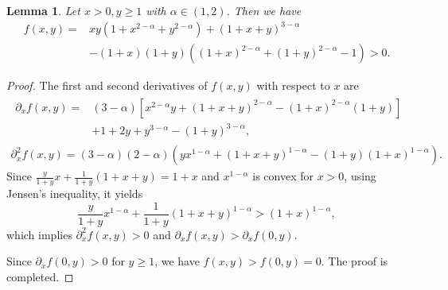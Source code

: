 \documentclass{amsart}
\newtheorem{lemma}[theorem]{Lemma}
\theoremstyle{definition}
\theoremstyle{remark}
\numberwithin{equation}{section}
\begin{document}
\begin{lemma} \label{eq:ineq_fxy}
    Let $x > 0, y\ge 1$ with $\alpha \in (1,2)$. Then we have
    \begin{equation*}
        \begin{aligned}
    f(x,y) =& xy(1+x^{2-\alpha} +y^{2-\alpha}) + (1+x+y)^{3-\alpha} \\
         &- (1+x)(1+y)\left( (1+x)^{2-\alpha} + (1+y)^{2-\alpha} - 1 \right) > 0.
        \end{aligned}
    \end{equation*}
\end{lemma}
\begin{proof}
    The first and second derivatives of $f(x,y)$ with respect to $x$ are
    \begin{gather*}
        \begin{aligned}
        \partial_x f(x,y) =&  
            (3-\alpha)\left[ x^{2-\alpha} y + (1+x+y)^{2-\alpha} - (1+x)^{2-\alpha}(1+y) \right] \\
            &+ 1+2y+y^{3-\alpha}-(1+y)^{3-\alpha} ,
        \end{aligned}  \\
        \partial_x^2 f(x, y) = (3-\alpha)(2-\alpha) \left( y x^{1-\alpha} + (1+x+y)^{1-\alpha} - (1+y) (1+x)^{1-\alpha} \right).
    \end{gather*}
    Since $\frac{y}{1+y}x + \frac{1}{1+y}(1+x+y) = 1+x$
    and $x^{1-\alpha}$ is convex for $x>0$,
    using Jensen's inequality, it yields
    \begin{equation*}
        \frac{y}{1+y} x^{1-\alpha} + \frac{1}{1+y} (1+x+y)^{1-\alpha} > (1+x)^{1-\alpha},
    \end{equation*}
    which implies $\partial_x^2 f(x, y) > 0$ and $\partial_x f(x, y)>\partial_x f(0, y)$. %

    Since $\partial_x f(0, y)>0$ for $y\ge 1$, we have $f(x,y)>f(0,y)=0$.
    The proof is completed.
    
\end{proof}
\end{document}
